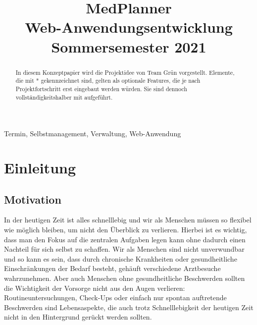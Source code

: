 \documentclass[conference]{IEEEtran}
\begin{document}
\title{MedPlanner\\
{\large Web-Anwendungsentwicklung Sommersemester 2021}
}

\author{
\and
{}
\and
{}
\and
{}
\and
{}
}

\maketitle

\begin{abstract}
In diesem Konzeptpapier wird die Projektidee von Team Grün vorgestellt. Elemente, die mit * gekennzeichnet sind, gelten als optionale Features, die je nach Projektfortschritt erst eingebaut werden würden. Sie sind dennoch vollständigkeitshalber mit aufgeführt.
\end{abstract}

\begin{IEEEkeywords}
Termin, Selbstmanagement, Verwaltung, Web-Anwendung
\end{IEEEkeywords}

\section{Einleitung}
\subsection{Motivation}
In der heutigen Zeit ist alles schnelllebig und wir als Menschen müssen so flexibel wie möglich bleiben, um nicht den Überblick zu verlieren. 
Hierbei ist es wichtig, dass man den Fokus auf die zentralen Aufgaben legen kann ohne dadurch einen Nachteil für sich selbst zu schaffen.
Wir als Menschen sind nicht unverwundbar und so kann es sein, dass durch chronische Krankheiten oder gesundheitliche Einschränkungen der Bedarf besteht, gehäuft verschiedene Arztbesuche wahrzunehmen.
Aber auch Menschen ohne gesundheitliche Beschwerden sollten die Wichtigkeit der Vorsorge nicht aus den Augen verlieren:
Routineuntersuchungen, Check-Ups oder einfach nur spontan auftretende Beschwerden sind Lebensaspekte, die auch trotz Schnelllebigkeit der heutigen Zeit nicht in den Hintergrund gerückt werden sollten.
\end{document}
